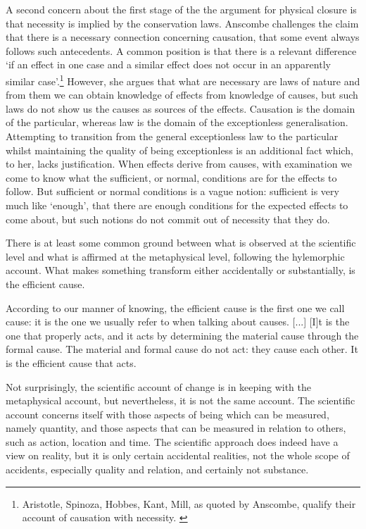 A second concern about the first stage of the the argument for physical closure is that necessity is implied by the conservation laws. Anscombe challenges the claim that there is a necessary connection concerning causation, that some event always follows such antecedents. A common position is that there is a relevant difference `if an effect in one case and a similar effect does not occur in an apparently similar case'.\footnote{Aristotle, Spinoza, Hobbes, Kant, Mill, as quoted by Anscombe, qualify their account of causation with necessity. \parencite[][]{Anscombe1993-CAD}}
However, she argues that what are necessary are laws of nature and from them we can obtain knowledge of effects from knowledge of causes, but such laws do not show us the causes as sources of the effects. Causation is the domain of the particular, whereas law is the domain of the exceptionless generalisation. Attempting to transition from the general exceptionless law to the particular whilst maintaining the quality of being exceptionless is an additional fact which, to her, lacks justification. When effects derive from causes, with examination we come to know what the sufficient, or normal, conditions are for the effects to follow. But sufficient or normal conditions is a vague notion: sufficient is very much like `enough', that there are enough conditions for the expected effects to come about, but such notions do not commit out of necessity that they do.

There is at least some common ground between what is observed at the scientific level and what is affirmed at the metaphysical level, following the hylemorphic account. What makes something transform either accidentally or substantially, is the efficient cause.
\begin{quoting}
According to our manner of knowing, the efficient cause is the first one we call cause: it is the one we usually refer to when talking about causes. [...] [I]t is the one that properly acts, and it acts by determining the material cause through the formal cause. The material and formal cause do not act: they cause each other. It is the efficient cause that acts. \parencite[][108--11]{de1981christian}
\end{quoting}
Not surprisingly, the scientific account of change is in keeping with the metaphysical account, but nevertheless, it is not the same account. The scientific account concerns itself with those aspects of being which can be measured, namely quantity, and those aspects that can be measured in relation to others, such as action, location and time. The scientific approach does indeed have a view on reality, but it is only certain accidental realities, not the whole scope of accidents, especially quality and relation, and certainly not substance.

